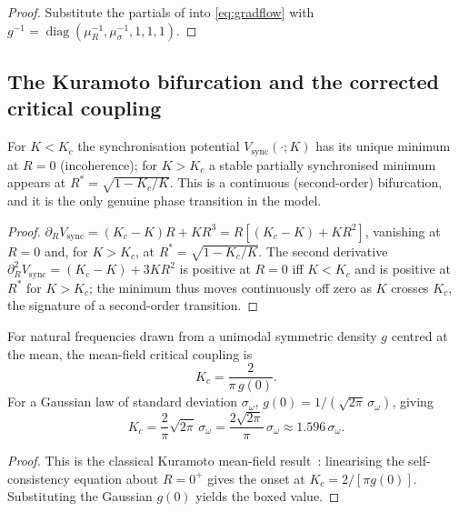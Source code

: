 \documentclass[11pt,twocolumn,a4paper]{article}
\newcommand{\Kc}{K_c}
\newcommand{\Ord}{R}
\begin{document}
\begin{proof}
Substitute the partials of  into \eqref{eq:gradflow} with
$g^{-1}=\operatorname{diag}(\mu_R^{-1},\mu_\sigma^{-1},1,1,1)$.
\end{proof}

\subsection{The Kuramoto bifurcation and the corrected critical coupling}

\begin{theorem}\label{thm:bifurcation}
For $K<\Kc$ the synchronisation potential $V_{\mathrm{sync}}(\cdot;K)$ has its
unique minimum at $\Ord=0$ (incoherence); for $K>\Kc$ a stable partially
synchronised minimum appears at $\Ord^*=\sqrt{1-\Kc/K}$. This is a continuous
(second-order) bifurcation, and it is the only genuine phase transition in the
model.
\end{theorem}

\begin{proof}
$\partial_\Ord V_{\mathrm{sync}}=(\Kc-K)\Ord+K\Ord^3=\Ord[(\Kc-K)+K\Ord^2]$,
vanishing at $\Ord=0$ and, for $K>\Kc$, at $\Ord^*=\sqrt{1-\Kc/K}$. The second
derivative $\partial^2_\Ord V_{\mathrm{sync}}=(\Kc-K)+3K\Ord^2$ is positive at
$\Ord=0$ iff $K<\Kc$ and is positive at $\Ord^*$ for $K>\Kc$; the minimum thus
moves continuously off zero as $K$ crosses $\Kc$, the signature of a
second-order transition.
\end{proof}

\begin{theorem}\label{thm:Kc}
For natural frequencies drawn from a unimodal symmetric density $g$ centred at
the mean, the mean-field critical coupling is
\[
\Kc=\frac{2}{\pi\,g(0)} .
\]
For a Gaussian law of standard deviation $\sigma_\omega$, $g(0)=1/(\sqrt{2\pi}
\,\sigma_\omega)$, giving
\[
\boxed{\;\Kc=\frac{2}{\pi}\sqrt{2\pi}\,\sigma_\omega=\frac{2\sqrt{2\pi}}{\pi}\,
\sigma_\omega\approx 1.596\,\sigma_\omega.\;}
\]
\end{theorem}

\begin{proof}
This is the classical Kuramoto mean-field result~\cite{kuramoto1975,strogatz2000,
acebron2005,dorfler2014}: linearising the self-consistency equation about
$\Ord=0^+$ gives the onset at $\Kc=2/[\pi g(0)]$. Substituting the Gaussian
$g(0)$ yields the boxed value.
\end{proof}
\end{document}
